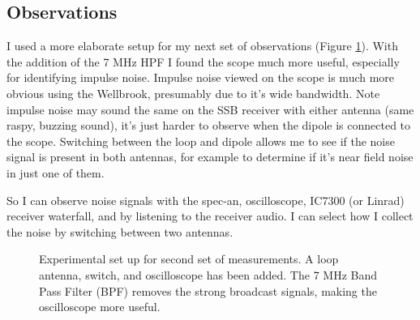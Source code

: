 \documentclass{article}
\begin{document}
\subsection{Observations}

I used a more elaborate setup for my next set of observations (Figure \ref{fig:meas_config_2}).  With the addition of the 7 MHz HPF I found the scope much more useful, especially for identifying impulse noise.  Impulse noise viewed on the scope is much more obvious using the Wellbrook, presumably due to it's wide bandwidth. Note impulse noise may sound the same on the SSB receiver with either antenna (same raspy, buzzing sound), it's just harder to observe when the dipole is connected to the scope. Switching between the loop and dipole allows me to see if the noise signal is present in both antennas, for example to determine if it's near field noise in just one of them.

So I can observe noise signals with the spec-an, oscilloscope, IC7300 (or Linrad) receiver waterfall, and by listening to the receiver audio.  I can select how I collect the noise by switching between two antennas.

\begin{figure}[h]
\caption{Experimental set up for second set of measurements.  A loop antenna, switch, and oscilloscope has been added. The 7 MHz Band Pass Filter (BPF) removes the strong broadcast signals, making the oscilloscope more useful.}
\label{fig:meas_config_2}
\begin{center}
\end{center}
\end{figure}
\end{document}
